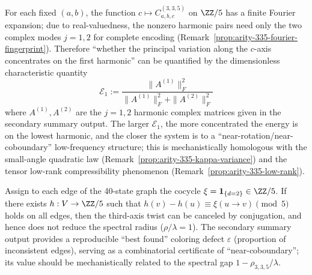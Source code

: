 

\begin{remark}\label{rem:arity-335-harmonic-energy}
For each fixed \((a,b)\), the function \(c\mapsto C^{(3,3,5)}_{a,b,c}\) on \(\ZZ/5\) has a finite Fourier expansion;
due to real-valuedness, the nonzero harmonic pairs need only the two complex modes \(j=1,2\) for complete encoding (Remark~\ref{prop:arity-335-fourier-fingerprint}).
Therefore ``whether the principal variation along the \(c\)-axis concentrates on the first harmonic'' can be quantified by the dimensionless characteristic quantity
$$
\mathcal{E}_1
:=\frac{\|A^{(1)}\|_F^2}{\|A^{(1)}\|_F^2+\|A^{(2)}\|_F^2}
$$
where \(A^{(1)},A^{(2)}\) are the \(j=1,2\) harmonic complex matrices given in the secondary summary output.
The larger \(\mathcal{E}_1\), the more concentrated the energy is on the lowest harmonic, and the closer the system is to a ``near-rotation/near-coboundary'' low-frequency structure; this is mechanistically homologous with the small-angle quadratic law (Remark~\ref{prop:arity-335-kappa-variance}) and the tensor low-rank compressibility phenomenon (Remark~\ref{prop:arity-335-low-rank}).
\end{remark}

\begin{remark}\label{rem:arity-335-best-5-coloring}
Assign to each edge of the 40-state graph the cocycle $\xi=\mathbf{1}_{\{d=2\}}\in\ZZ/5$. If there exists $h:V\to\ZZ/5$ such that $h(v)-h(u)\equiv \xi(u\to v)\pmod 5$ holds on all edges, then the third-axis twist can be canceled by conjugation, and hence does not reduce the spectral radius ($\rho/\lambda=1$). The secondary summary output provides a reproducible ``best found'' coloring defect $\varepsilon$ (proportion of inconsistent edges), serving as a combinatorial certificate of ``near-coboundary''; its value should be mechanistically related to the spectral gap $1-\rho_{3,3,5}/\lambda$.
\end{remark}

